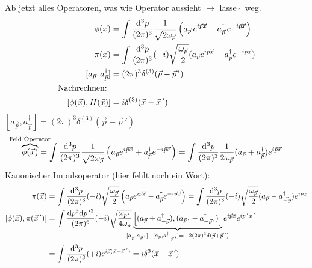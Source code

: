 Ab jetzt alles Operatoren, was wie Operator aussieht $\rightarrow$ lasse \,$\hat{}$\, weg.
	\begin{align*}
		\phi(\vec{x}) &= \int \frac{\mathrm{d}^3 p}{(2\pi)^3} 
		\frac{1}{\sqrt{2\omega_{\vec{p}}}} 
		\left(
			a_{\vec{p}}\, e^{i \vec{p} \vec{x}} -
			a^\dagger_{\vec{p}} \,e^{- i \vec{p} \vec{x}}
		\right) \\
		\pi (\vec{x}) &= \int \frac{\mathrm{d}^3 p}{(2 \pi)^3} (-i) \sqrt{\frac{\omega_{\vec{p}}}{2}} (a_{\vec{p}}e^{i \vec{p}\vec{x}} - a_{\vec{p}}^\dagger e^{-i \vec{p}\vec{x}})
		\\
		[a_{\vec{p}}, a_{\vec{p}}^\dagger] &= (2\pi)^3 \delta^{(3)}(\vec{p}- \vec{p}\,') \\			
		\text{Nachrechnen: } \\ [\phi(\vec{x}), H(\vec{x})] &= i \delta^{(3)}(\vec{x}- \vec{x}\,')
	\end{align*}
$[a_{\vec{p}}, a_{\vec{p}}^\dagger] = (2\pi)^3 \delta^{(3)} (\vec{p} - \vec{p}\,')$ 
	\begin{align*}
		\overbrace{\phi (\vec{x})}^{\mathclap{\text{Feld Operator}}} &= \int \frac{\diff^3 p}{(2 \pi)^3} \frac{1}{\sqrt{2 \omega_{\vec{p}}}} 
		\left(
			a_{\vec{p}} e^{i \vec{p} \vec{x}} + a_{\vec{p}}^\dagger e^{-i\vec{p} \vec{x}}
		\right) 
		= \int \frac{\diff^3 p}{(2\pi)^3} \frac{1}{2 \omega_{\vec{p}}} (a_{\vec{p}} + a_{\vec{p}}^\dagger) e^{i \vec{p} \vec{x}}
	\end{align*}
Kanonischer Impulsoperator (hier fehlt noch ein Wort):
	\begin{align*}
		\pi (\vec{x}) &= \int \frac{\diff^3 p}{(2\pi)^3} (-i) \sqrt{\frac{\omega_{\vec{p}}}{2}} 
		\left(
			a_{\vec{p}} e^{i\vec{p} \vec{x}} - a^\dagger_{\vec{p}} e^{-i\vec{p} \vec{x}}
		\right) 
		= \int \frac{\diff^3 p}{(2\pi)^3} (-i) \sqrt{\frac{\omega_{\vec{p}}}{2}} 
		(a_{\vec{p}} - a_{\vec{-p}}^\dagger) e^{ipx} \\
		[\phi(\vec{x}), \pi(\vec{x}\,')] &=
		\int \frac{\diff p^3 \diff p\,'^3}{(2\pi)^6} (-i) \sqrt{\frac{\omega_{p\,'}}{4 \omega_p}} 
		\underbrace{
		\left[
			(a_{\vec{p}} + a_{-\vec{p}}^\dagger), (a_{\vec{p}\,'} - a_{-\vec{p}\,'}^\dagger)
		\right]}_{\mathclap{
				[a_{\vec{p}}^\dagger, a_{\vec{p}\,'}] - [a_{\vec{p}}, a_{-\vec{p}\,'}^\dagger] = -2 (2\pi)^3 \delta (\vec{p}+\vec{p}\,')
			}}
		e^{i\vec{p}\vec{x}} e^{i p\,' x\,'} \\
		&= \int \frac{\diff^3 p}{(2\pi)^3} (+i) e^{i \vec{p} (\vec{x}- \vec{x}\,')} = 
		i\delta^3(\vec{x}- \vec{x}\,')
	\end{align*}

